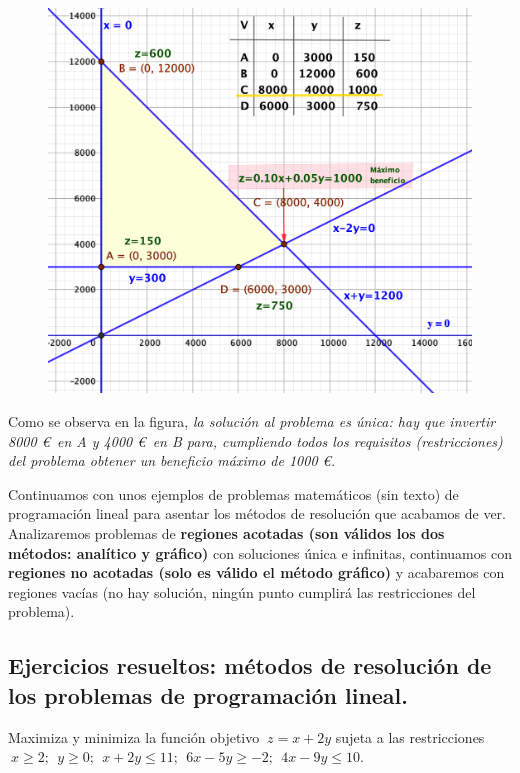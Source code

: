 \begin{figure}[H]
	\centering
	\includegraphics[width=.75\textwidth]{imagenes/img13b.png}
\end{figure}

\begin{destacado}
\begin{small}	Como se observa en la figura, \emph{la solución al problema es única:	hay que invertir 8000 \euro $\,$  en A y 4000 \euro $\,$ en B para, cumpliendo todos los requisitos (restricciones) del problema obtener un beneficio máximo de 1000 \euro.} \end{small}
\end{destacado}	

\vspace{3mm}
Continuamos con unos ejemplos de problemas matemáticos (sin texto) de programación lineal para asentar los métodos de resolución que acabamos de ver. Analizaremos problemas de \textbf{regiones acotadas (son válidos los dos métodos: analítico y gráfico)} con soluciones única e infinitas, continuamos con \textbf{regiones no acotadas (solo es válido el método gráfico)} y acabaremos con regiones vacías (no hay solución, ningún punto cumplirá las restricciones del problema).

\subsection{Ejercicios resueltos: métodos de resolución de los problemas de programación lineal.}

\vspace{3mm}	
\begin{ejemplo}
\begin{ejre}
Maximiza y minimiza la función objetivo $\ z=x+2y$ sujeta a las restricciones 	$\ x\ge 2;\ \ y\ge 0;\ \ x+2y\le 11;\ \ 6x-5y\ge -2;\ \ 4x-9y\le 10$.
\end{ejre}
\end{ejemplo}

